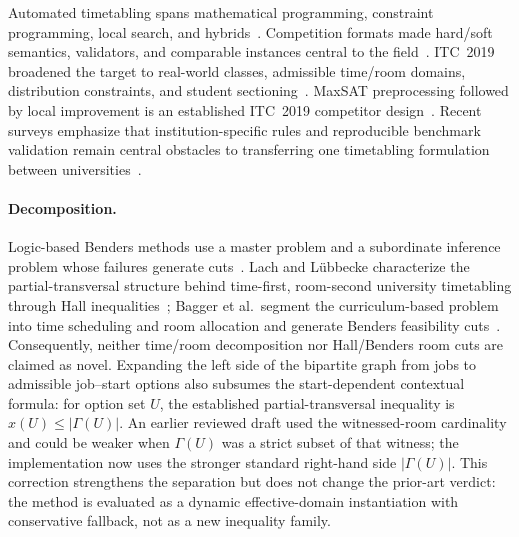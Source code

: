 Automated timetabling spans mathematical programming, constraint programming, local search, and hybrids~\cite{schaerf1999survey,lewis2008metaheuristics,bettinelli2015overview}.
Competition formats made hard/soft semantics, validators, and comparable instances central to the field~\cite{mccollum2010itc,bonutti2012benchmarking}.
ITC~2019 broadened the target to real-world classes, admissible time/room domains, distribution constraints, and student sectioning~\cite{muller2025itc2019}.
MaxSAT preprocessing followed by local improvement is an established ITC~2019 competitor design~\cite{lemos2022unicort}.
Recent surveys emphasize that institution-specific rules and reproducible benchmark validation remain central obstacles to transferring one timetabling formulation between universities~\cite{rossi2022survey}.

\paragraph{Decomposition.}
Logic-based Benders methods use a master problem and a subordinate inference problem whose failures generate cuts~\cite{hooker2003logic}.
Lach and L{\"u}bbecke characterize the partial-transversal structure behind time-first, room-second university timetabling through Hall inequalities~\cite{lach2008partial}; Bagger et al.\ segment the curriculum-based problem into time scheduling and room allocation and generate Benders feasibility cuts~\cite{bagger2018benders}.
Consequently, neither time/room decomposition nor Hall/Benders room cuts are claimed as novel.
Expanding the left side of the bipartite graph from jobs to admissible job--start options also subsumes the start-dependent contextual formula: for option set $U$, the established partial-transversal inequality is $x(U)\le |\Gamma(U)|$.
An earlier reviewed draft used the witnessed-room cardinality and could be weaker when $\Gamma(U)$ was a strict subset of that witness; the implementation now uses the stronger standard right-hand side $|\Gamma(U)|$.
This correction strengthens the separation but does not change the prior-art verdict: the method is evaluated as a dynamic effective-domain instantiation with conservative fallback, not as a new inequality family.

